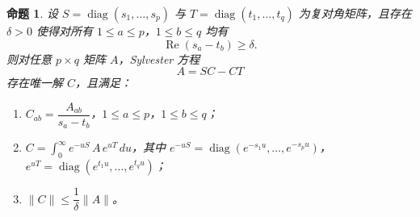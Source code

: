\documentclass[11pt]{article}
\newtheorem{proposition}{命题}
\begin{document}
\begin{proposition}
设 $S = \operatorname{diag}(s_1, \ldots, s_p)$ 与 $T = \operatorname{diag}(t_1, \ldots, t_q)$ 为复对角矩阵，且存在 $\delta > 0$ 使得对所有 $1 \le a \le p$，$1 \le b \le q$ 均有
\[
\operatorname{Re}(s_a - t_b) \ge \delta.
\]
则对任意 $p \times q$ 矩阵 $A$，Sylvester 方程
\[
A = SC - CT
\]
存在唯一解 $C$，且满足：
\begin{enumerate}
  \item[(i)] $C_{ab} = \dfrac{A_{ab}}{s_a - t_b}$，$1 \le a \le p$，$1 \le b \le q$；
  \item[(ii)] $C = \displaystyle\int_0^\infty e^{-uS}\, A\, e^{uT}\, du$，其中 $e^{-uS} = \operatorname{diag}(e^{-s_1 u}, \ldots, e^{-s_p u})$，$e^{uT} = \operatorname{diag}(e^{t_1 u}, \ldots, e^{t_q u})$；
  \item[(iii)] $\|C\| \le \dfrac{1}{\delta} \|A\|$。
\end{enumerate}
\end{proposition}
\end{document}
